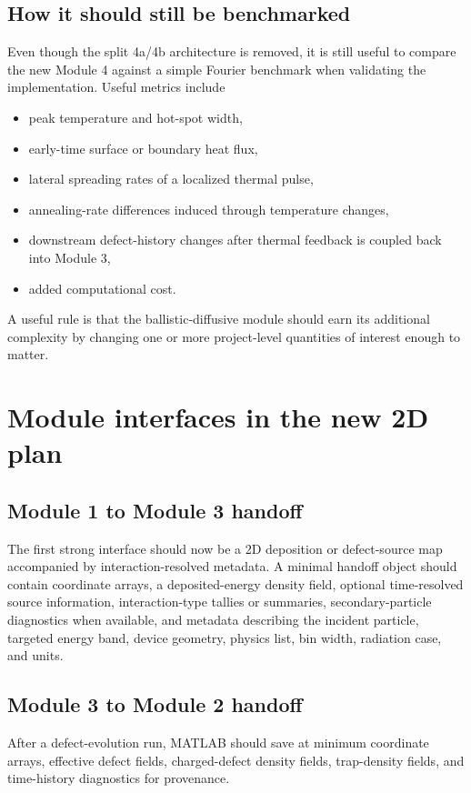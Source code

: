 \documentclass[11pt]{article}
\begin{document}
\subsection{How it should still be benchmarked}
Even though the split 4a/4b architecture is removed, it is still useful to compare the new Module 4 against a simple Fourier benchmark when validating the implementation. Useful metrics include
\begin{itemize}[leftmargin=1.5em]
    \item peak temperature and hot-spot width,
    \item early-time surface or boundary heat flux,
    \item lateral spreading rates of a localized thermal pulse,
    \item annealing-rate differences induced through temperature changes,
    \item downstream defect-history changes after thermal feedback is coupled back into Module 3,
    \item added computational cost.
\end{itemize}
A useful rule is that the ballistic-diffusive module should earn its additional complexity by changing one or more project-level quantities of interest enough to matter.

\section{Module interfaces in the new 2D plan}
\subsection{Module 1 to Module 3 handoff}
The first strong interface should now be a 2D deposition or defect-source map accompanied by interaction-resolved metadata. A minimal handoff object should contain coordinate arrays, a deposited-energy density field, optional time-resolved source information, interaction-type tallies or summaries, secondary-particle diagnostics when available, and metadata describing the incident particle, targeted energy band, device geometry, physics list, bin width, radiation case, and units.

\subsection{Module 3 to Module 2 handoff}
After a defect-evolution run, MATLAB should save at minimum coordinate arrays, effective defect fields, charged-defect density fields, trap-density fields, and time-history diagnostics for provenance.
\end{document}
